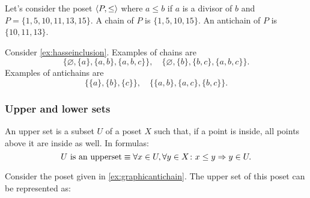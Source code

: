 \begin{example}
Let's consider the poset $\langle P,\leq\rangle$ where $a\leq b$ if $a$ is a divisor of $b$ and $P=\{1,5,10,11,13,15\}$. A chain of $P$ is $\{1,5,10,15\}$. An antichain of $P$ is $\{10,11,13\}$.
\end{example}

\begin{example}
Consider \cref{ex:hasseinclusion}. Examples of chains are 
\begin{equation}
    \{\varnothing,\{a\},\{a,b\},\{a,b,c\}\}, \quad  \{\varnothing,\{b\},\{b,c\},\{a,b,c\}\}.
\end{equation}
Examples of antichains are
\begin{equation}
    \{\{a\},\{b\},\{c\}\}, \quad \{ \{a,b\},\{a,c\}, \{b,c\}\}.
\end{equation}
\end{example}

\subsubsection{Upper and lower sets}

\begin{definition}
\label{def:upperset}An upper set is a subset $U$ of a poset $X$ such
that, if a point is inside, all points above it are inside as well.
In formulas:
\begin{equation}
\text{$U$ is an upperset} \equiv \forall x\in U, \forall y\in X\colon x\leq y \Rightarrow y\in U.
\end{equation}
\end{definition}
\begin{example}
Consider the poset given in \cref{ex:graphicantichain}. The upper set of this poset can be represented as:
\begin{center}
\hspace{1cm} 
\end{center}
\end{example}

